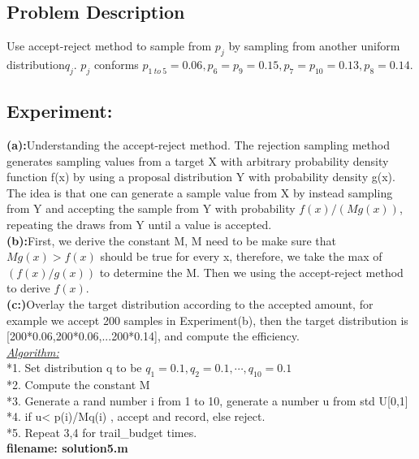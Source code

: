 \documentclass[twoside]{article}
\begin{document}
\subsection{\normalsize{Problem Description}}
\noindent Use accept-reject method to sample from $p_j$ by sampling from another uniform distribution$q_j$.
\noindent $p_j$ conforms $p_{1 \ to \ 5}=0.06,p_6 = p_9=0.15,p_7=p_10=0.13,p_8=0.14.$\\

\subsection{\normalsize{Experiment:}}
\noindent \textbf {(a):}Understanding the accept-reject method. The rejection sampling method generates sampling values from a target X with arbitrary probability density function f(x) by using a proposal distribution Y with probability density g(x). The idea is that one can generate a sample value from X by instead sampling from Y and accepting the sample from Y with probability ${\displaystyle f(x)/(Mg(x))}$, repeating the draws from Y until a value is accepted. \\
\noindent \textbf {(b):}First, we derive the constant M, M need to be make sure that $Mg(x) > f(x)$ should be true for every x, therefore, we take the max of $(f(x)/g(x))$ to determine the M. Then we using the accept-reject method to derive $f(x)$.\\
\noindent \textbf {(c:)}Overlay the target distribution according to the accepted amount, for example we accept 200 samples in Experiment(b), then the target distribution is [200*0.06,200*0.06,...200*0.14], and compute the efficiency.\\[10pt]
\underline{\emph{Algorithm:}}\\[10pt]
*1. Set distribution q to be {$q_1=0.1,q_2=0.1,\cdots,q_{10}=0.1$}\\
*2. Compute the constant M\\
*3. Generate a rand number i from 1 to 10, generate a number u from std U[0,1]\\
*4. if u< p(i)/Mq(i) , accept and record, else reject.\\
*5. Repeat 3,4 for trail\_budget times.\\
\noindent \textbf {filename: solution5.m}\\
\end{document}

